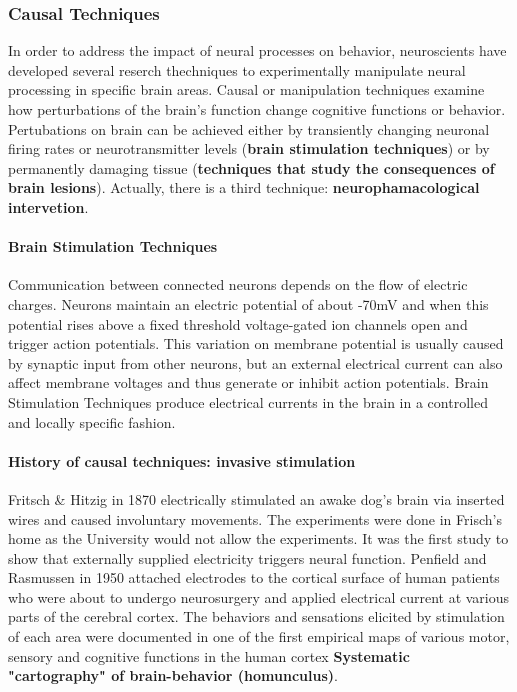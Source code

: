 \documentclass[12pt,article,oneside,a4paper]{memoir}
\begin{document}
\subsubsection{Causal Techniques}
In order to address the impact of neural processes on behavior, neuroscients have developed several reserch thechniques to experimentally manipulate neural processing in specific brain areas. Causal or manipulation techniques examine how perturbations of the brain’s function change cognitive functions or behavior. Pertubations on brain can be achieved either by transiently changing neuronal firing rates or neurotransmitter levels (\textbf{brain stimulation techniques}) or by permanently damaging tissue (\textbf{techniques that study the consequences of brain lesions}). Actually, there is a third technique: \textbf{neurophamacological intervetion}.

\paragraph{Brain Stimulation Techniques} Communication between connected neurons depends on the flow of electric charges. Neurons maintain an electric potential of about -70mV and when this potential rises above a fixed threshold voltage-gated ion channels open and trigger action potentials. This variation on membrane potential is usually caused by synaptic input from other neurons, but an external electrical current can also affect membrane voltages and thus generate or inhibit action potentials. Brain Stimulation Techniques produce electrical currents in the brain in a controlled and locally specific fashion.

\paragraph{History of causal techniques: invasive stimulation} Fritsch \& Hitzig in 1870 electrically stimulated an awake dog's brain via inserted wires and caused involuntary movements. The experiments were done in Frisch's home as the University would not allow the experiments. It was the first study to show that externally supplied electricity triggers neural function. Penfield and Rasmussen in 1950 attached electrodes to the cortical surface of human patients who were about to undergo neurosurgery and applied electrical current at various parts of the cerebral cortex. The behaviors and sensations elicited by stimulation of each area were documented in one of the first empirical maps of various motor, sensory and cognitive functions in the human cortex \textbf{Systematic "cartography" of brain-behavior (homunculus)}.\\
\end{document}
